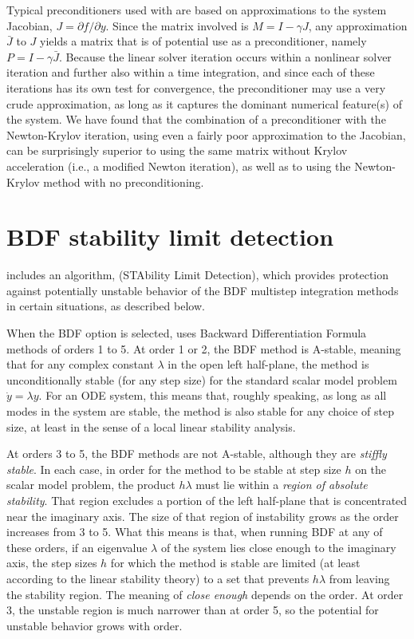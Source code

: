 Typical preconditioners used with {\cvodes} are based on approximations
to the system Jacobian, $J = \partial f / \partial y$.  Since the
matrix involved is $M = I - \gamma J$, any
approximation $\bar{J}$ to $J$ yields a matrix that is of potential
use as a preconditioner, namely $P = I - \gamma \bar{J}$.  Because the
linear solver iteration occurs within a nonlinear solver iteration and further also
within a time integration, and since each of these iterations has its
own test for convergence, the preconditioner may use a very crude
approximation, as long as it captures the dominant numerical
feature(s) of the system.  We have found that the combination of a
preconditioner with the Newton-Krylov iteration, using even a fairly
poor approximation to the Jacobian, can be surprisingly superior to
using the same matrix without Krylov acceleration (i.e., a modified
Newton iteration), as well as to using the Newton-Krylov method with
no preconditioning.


\section{BDF stability limit detection}\label{s:bdf_stab}

{\cvodes} includes an algorithm, {\stald} (STAbility Limit Detection),
which provides protection against potentially unstable behavior of the
BDF multistep integration methods in certain situations, as described below.

When the BDF option is selected, {\cvodes} uses Backward Differentiation
Formula methods of orders 1 to 5.  At order 1 or 2, the BDF
method is A-stable, meaning that for any complex constant $\lambda$ in
the open left half-plane, the method is unconditionally stable (for
any step size) for the standard scalar model problem $\dot{y} = \lambda y$.
For an ODE system, this means that, roughly speaking, as long as all
modes in the system are stable, the method is also stable for any
choice of step size, at least in the sense of a local linear stability
analysis.

At orders 3 to 5, the BDF methods are not A-stable, although they are
{\em stiffly stable}. In each case, in order for the method to be stable
at step size $h$ on the scalar model problem, the product $h\lambda$ must
lie within a {\em region of absolute stability}.
That region excludes a portion of the left half-plane that is concentrated
near the imaginary axis.  The size of that region of instability grows as the order
increases from 3 to 5.  What this means is that, when running BDF at
any of these orders, if an eigenvalue $\lambda$ of the system lies close
enough to the imaginary axis, the step sizes $h$ for which the method is
stable are limited (at least according to the linear stability theory)
to a set that prevents $h\lambda$ from leaving the stability region.
The meaning of {\em close enough} depends on the order.
At order 3, the unstable region is much narrower than at order 5,
so the potential for unstable behavior grows with order.

